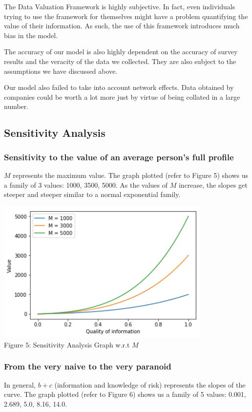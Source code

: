 \documentclass{icmmcm}
\begin{document}
The Data Valuation Framework is highly subjective. In fact, even individuals trying to use the framework for themselves might have a problem quantifying the value of their information. As such, the use of this framework introduces much bias in the model.

The accuracy of our model is also highly dependent on the accuracy of survey results and the veracity of the data we collected. They are also subject to the assumptions we have discussed above. 

Our model also failed to take into account network effects. Data obtained by companies could be worth a lot more just by virtue of being collated in a large number. 

\subsection{Sensitivity Analysis}

\subsubsection*{Sensitivity to the value of an average person's full profile} 
$M$  represents the maximum value. 
The graph plotted (refer to Figure 5) shows us a family of 3 values: 1000, 3500, 5000.
As the values of $M$ increase, the slopes get steeper and steeper similar to a normal exponential family.

\includegraphics[width=0.8\textwidth]{variousm.png}
\\ \caption{Figure 5: Sensitivity Analysis Graph w.r.t $M$}

\subsubsection*{From the very naive to the very paranoid} 
In general, $b+c$ (information and knowledge of risk) represents the slopes of the curve. The graph plotted (refer to Figure 6) shows us a family of 5 values: 0.001, 2.689, 5.0, 8.16, 14.0.
\end{document}
